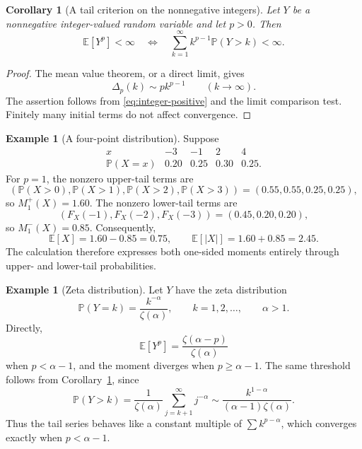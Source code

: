 \documentclass[11pt]{article}
\newtheorem{corollary}[theorem]{Corollary}
\theoremstyle{definition}
\newtheorem{example}[theorem]{Example}
\theoremstyle{remark}
\newcommand{\E}{\mathbb{E}}
\newcommand{\Pp}{\mathbb{P}}
\newcommand{\abs}[1]{\left\lvert #1\right\rvert}
\begin{document}
\begin{corollary}[A tail criterion on the nonnegative integers]
\label{cor:lattice-criterion}
Let $Y$ be a nonnegative integer-valued random variable and let $p>0$.
Then
\[
  \E[Y^p]<\infty
  \quad\Longleftrightarrow\quad
  \sum_{k=1}^\infty k^{p-1}\Pp(Y>k)<\infty.
\]
\end{corollary}

\begin{proof}
The mean value theorem, or a direct limit, gives
\[
  \Delta_p(k)\sim p k^{p-1}\qquad(k\to\infty).
\]
The assertion follows from \eqref{eq:integer-positive} and the limit
comparison test.  Finitely many initial terms do not affect convergence.
\end{proof}

\begin{example}[A four-point distribution]\label{ex:four-point}
Suppose
\[
\begin{array}{c|rrrr}
x&-3&-1&2&4\\ \hline
\Pp(X=x)&0.20&0.25&0.30&0.25.
\end{array}
\]
For $p=1$, the nonzero upper-tail terms are
\[
  (\Pp(X>0),\Pp(X>1),\Pp(X>2),\Pp(X>3))
  =(0.55,0.55,0.25,0.25),
\]
so $M_1^+(X)=1.60$.  The nonzero lower-tail terms are
\[
 (F_X(-1),F_X(-2),F_X(-3))=(0.45,0.20,0.20),
\]
so $M_1^-(X)=0.85$.  Consequently,
\[
  \E[X]=1.60-0.85=0.75,
  \qquad
  \E[\abs X]=1.60+0.85=2.45.
\]
The calculation therefore expresses both one-sided moments entirely through
upper- and lower-tail probabilities.
\end{example}

\begin{example}[Zeta distribution]\label{ex:zeta}
Let $Y$ have the zeta distribution
\[
  \Pp(Y=k)=\frac{k^{-\alpha}}{\zeta(\alpha)},
  \qquad k=1,2,\ldots,
  \qquad \alpha>1.
\]
Directly,
\[
  \E[Y^p]
  =\frac{\zeta(\alpha-p)}{\zeta(\alpha)}
\]
when $p<\alpha-1$, and the moment diverges when $p\geq\alpha-1$.
The same threshold follows from Corollary~\ref{cor:lattice-criterion}, since
\[
  \Pp(Y>k)
  =\frac{1}{\zeta(\alpha)}\sum_{j=k+1}^\infty j^{-\alpha}
  \sim\frac{k^{1-\alpha}}{(\alpha-1)\zeta(\alpha)}.
\]
Thus the tail series behaves like a constant multiple of
$\sum k^{p-\alpha}$, which converges exactly when $p<\alpha-1$.
\end{example}
\end{document}
